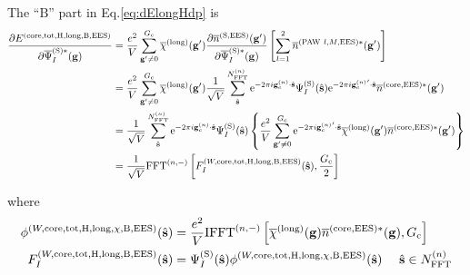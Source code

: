 \documentclass[paper=a4, fontsize=11pt]{article} %
\numberwithin{equation}{section} %
\numberwithin{figure}{section} %
\numberwithin{table}{section} %
\newcommand{\p}{\partial}
\newcommand{\ol}{\overline}
\newcommand{\bs}{{\bf{s}}}
\newcommand{\bg}{{\bf{g}}}
\newcommand{\hs}{{\hat{\bf{s}}}}
\newcommand{\rS}{{\mathrm{S}}}
\newcommand{\rEES}{{\mathrm{EES}}}
\newcommand{\rcore}{{\mathrm{core}}}
\newcommand{\re}{{\mathrm{e}}}
\newcommand{\rlong}{{\mathrm{long}}}
\newcommand{\rP}{{\mathrm{PAW}}}
\newcommand{\rH}{{\mathrm{H}}}
\newcommand{\rB}{{\mathrm{B}}}
\newcommand{\rtot}{{\mathrm{tot}}}
\newcommand{\gcn}{{\bg_c^{(n)}}}
\newcommand{\igcns}{2\pi i\gcn\cdot\hat \bs}
\newcommand{\igpcns}{2\pi i\gcn'\cdot\hat \bs}
\newcommand{\psigsc}{{\overline \Psi_I^{(\rS)*}(\bg)}}
\newcommand{\NFFTn}{{N^{(n)}_{\mathrm{FFT}}}}
\newcommand{\Gc}{{G_{\mathrm{c}}}}
\newcommand{\hGc}{{\frac{G_{\mathrm{c}}}{2}}}
\newcommand{\FFTni}{{\mathrm{FFT}^{(n,-)}}}
\newcommand{\IFFTni}{{\mathrm{IFFT}^{(n,-)}}}
\newcommand{\hsinn}{{\ \ \ \ \hs \in \NFFTn}}
\begin{document}
The ``$\rB$'' part in Eq.\eqref{eq:dElongHdp} is
\begin{equation}
\begin{split}
\frac{\p E^{(\rcore,\rtot,\rH,\rlong,\rB,\rEES)}}{\p \psigsc}
&= \frac{e^2}{V} \sum_{\bg' \neq 0}^{\Gc} \ol \chi^{(\rlong)} (\bg') \frac{\p \ol{n}^{(\rS,\rEES)}(\bg')}{\p \psigsc}\left[\sum_{l=1}^2 \ol{n}^{(\rP\ l,M,\rEES)*}(\bg')\right] \\
&= \frac{e^2}{V} \sum_{\bg' \neq 0}^{\Gc} \ol \chi^{(\rlong)} (\bg') \frac{1}{\sqrt V} \sum_{\hat \bs}^\NFFTn   \re^{-\igcns}\Psi_{I}^{(\rS)}(\hat \bs) \re^{-\igpcns}\ol{n}^{(\rcore,\rEES)*}(\bg') \\
&= \frac{1}{\sqrt V} \sum_{\hat \bs}^\NFFTn  \re^{-\igcns}\Psi_{I}^{(\rS)}(\hat \bs) \left\{\frac{e^2}{V} \sum_{\bg' \neq 0}^{\Gc} \re^{-\igpcns} \ol \chi^{(\rlong)} (\bg') \ol{n}^{(\rcore,\rEES)*}(\bg') \right\} \\
&=\frac{1}{\sqrt V} \FFTni \left[F_I^{(W,\rcore,\rtot,\rH,\rlong,\rB,\rEES)}(\hs),\hGc\right]\\
\end{split}
\end{equation}


where
\begin{equation}
\begin{split}
\phi^{(W,\rcore,\rtot,\rH,\rlong,\chi,\rB,\rEES)}(\hs) &= \frac{e^2}{V} \IFFTni \left[ \ol \chi^{(\rlong)} (\bg) \ol{n}^{(\rcore,\rEES)*}(\bg),\Gc\right]\\
F_I^{(W,\rcore,\rtot,\rH,\rlong,\rB,\rEES)}(\hs) &= \Psi_{I}^{(\rS)}(\hat \bs) \phi^{(W,\rcore,\rtot,\rH,\rlong,\chi,\rB,\rEES)}(\hs) \hsinn\\
\end{split}
\end{equation}
\end{document}
